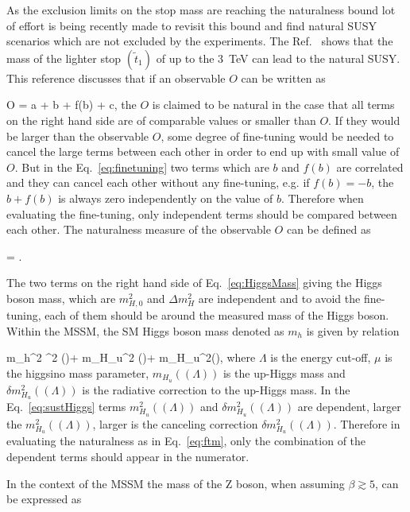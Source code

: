 As the exclusion limits on the stop mass are reaching the naturalness bound lot of effort is being recently made to revisit this bound and find natural SUSY scenarios which are not excluded by the experiments. The Ref.~\cite{Baer:2016bwh} shows that the mass of the lighter stop $(\tilde{t}_{1})$ of up to the 3~TeV can lead to the natural SUSY. This reference discusses that if an observable $O$ can be written as

{
O = a + b + f(b) + c,
}
the $O$ is claimed to be natural in the case that all terms on the right hand side are of comparable values or smaller than $O$. If they would be larger than the observable $O$, some degree of fine-tuning would be needed to cancel the large terms between each other in order to end up with small value of $O$. But in the Eq.~\ref{eq:finetuning} two terms which are $b$ and $f(b)$ are correlated and they can cancel each other without any fine-tuning, e.g. if $f(b) = -b$, the $b+f(b)$ is always zero independently on the value of $b$. Therefore when evaluating the fine-tuning, only independent terms should be compared between each other. The naturalness measure of the observable $O$ can be defined as 

{
\Delta = .
}

The two terms on the right hand side of  Eq.~\ref{eq:HiggsMass} giving the Higgs boson mass, which are $m_{H,0}^{2}$ and $\Delta m_{H}^{2}$ are independent and to avoid the fine-tuning, each of them should be around the measured mass of the Higgs boson. Within the MSSM, the SM Higgs boson mass denoted as $m_{h}$ is given by relation

{
m_{h}^{2}  \mu^{2} (\Lambda)+ m_{H_{u}}^{2} (\Lambda)+ \delta m_{H_{u}}^{2}(\Lambda),
}
where $\Lambda$ is the energy cut-off, $\mu$ is the higgsino mass parameter, $m_{H_{u}}((\Lambda))$ is the up-Higgs mass and $\delta m_{H_{u}}^{2}((\Lambda))$ is the radiative correction to the up-Higgs mass. In the Eq.~\ref{eq:sustHiggs} terms $m_{H_{u}}^{2} ((\Lambda))$ and  $\delta m_{H_{u}}^{2} ((\Lambda))$ are dependent, larger the $m_{H_{u}}^{2} ((\Lambda))$, larger is the canceling correction  $\delta m_{H_{u}}^{2} ((\Lambda))$. Therefore in evaluating the naturalness as in Eq.~\ref{eq:ftm}, only the combination of the dependent terms should appear in the numerator.

In the context of the MSSM the mass of the Z boson, when assuming $\beta \gtrsim 5 $, can be expressed as 

